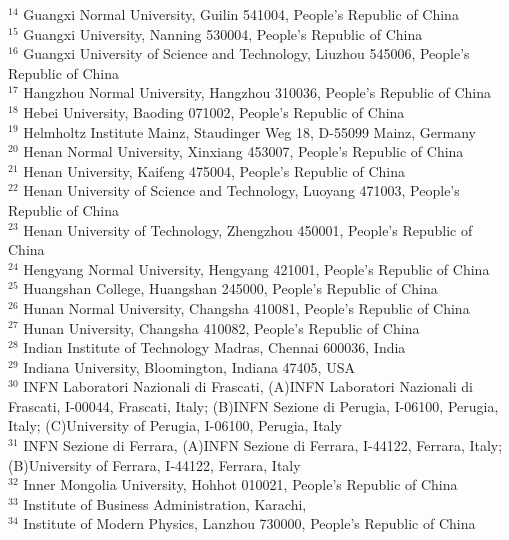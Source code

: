 \documentclass[prd,aps,reprint,noeprint,superscriptaddress,amsmath, amssymb]{revtex4-1}
\begin{document}
\begin{widetext}
\begin{center}
{$^{14}$ Guangxi Normal University, Guilin 541004, People's Republic of China\\
$^{15}$ Guangxi University, Nanning 530004, People's Republic of China\\
$^{16}$ Guangxi University of Science and Technology, Liuzhou 545006, People's Republic of China\\
$^{17}$ Hangzhou Normal University, Hangzhou 310036, People's Republic of China\\
$^{18}$ Hebei University, Baoding 071002, People's Republic of China\\
$^{19}$ Helmholtz Institute Mainz, Staudinger Weg 18, D-55099 Mainz, Germany\\
$^{20}$ Henan Normal University, Xinxiang 453007, People's Republic of China\\
$^{21}$ Henan University, Kaifeng 475004, People's Republic of China\\
$^{22}$ Henan University of Science and Technology, Luoyang 471003, People's Republic of China\\
$^{23}$ Henan University of Technology, Zhengzhou 450001, People's Republic of China\\
$^{24}$ Hengyang Normal University, Hengyang 421001, People's Republic of China\\
$^{25}$ Huangshan College, Huangshan 245000, People's Republic of China\\
$^{26}$ Hunan Normal University, Changsha 410081, People's Republic of China\\
$^{27}$ Hunan University, Changsha 410082, People's Republic of China\\
$^{28}$ Indian Institute of Technology Madras, Chennai 600036, India\\
$^{29}$ Indiana University, Bloomington, Indiana 47405, USA\\
$^{30}$ INFN Laboratori Nazionali di Frascati, (A)INFN Laboratori Nazionali di Frascati, I-00044, Frascati, Italy; (B)INFN Sezione di Perugia, I-06100, Perugia, Italy; (C)University of Perugia, I-06100, Perugia, Italy\\
$^{31}$ INFN Sezione di Ferrara, (A)INFN Sezione di Ferrara, I-44122, Ferrara, Italy; (B)University of Ferrara, I-44122, Ferrara, Italy\\
$^{32}$ Inner Mongolia University, Hohhot 010021, People's Republic of China\\
$^{33}$ Institute of Business Administration, Karachi,\\
$^{34}$ Institute of Modern Physics, Lanzhou 730000, People's Republic of China\\
}
\end{center}
\end{widetext}
\end{document}
